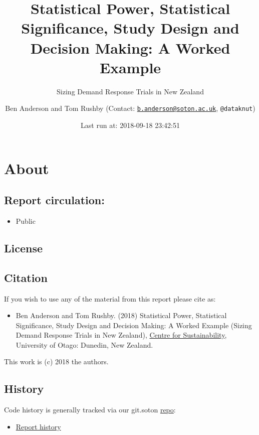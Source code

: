 \documentclass[]{article}
\title{Statistical Power, Statistical Significance, Study Design and Decision
Making: A Worked Example}
\subtitle{Sizing Demand Response Trials in New Zealand}
\author{Ben Anderson and Tom Rushby (Contact:
\href{mailto:b.anderson@soton.ac.uk}{\nolinkurl{b.anderson@soton.ac.uk}},
\texttt{@dataknut})}
\date{Last run at: 2018-09-18 23:42:51}
\providecommand{\tightlist}{%
  \setlength{\itemsep}{0pt}\setlength{\parskip}{0pt}}
\theoremstyle{definition}
\theoremstyle{definition}
\theoremstyle{definition}
\theoremstyle{remark}
\begin{document}
\maketitle

{
\setcounter{tocdepth}{2}
\tableofcontents
}
\newpage

\section{About}\label{about}

\subsection{Report circulation:}\label{report-circulation}

\begin{itemize}
\tightlist
\item
  Public
\end{itemize}

\subsection{License}\label{license}

\subsection{Citation}\label{citation}

If you wish to use any of the material from this report please cite as:

\begin{itemize}
\tightlist
\item
  Ben Anderson and Tom Rushby. (2018) Statistical Power, Statistical
  Significance, Study Design and Decision Making: A Worked Example
  (Sizing Demand Response Trials in New Zealand),
  \href{http://www.otago.ac.nz/centre-sustainability/}{Centre for
  Sustainability}, University of Otago: Dunedin, New Zealand.
\end{itemize}

This work is (c) 2018 the authors.

\subsection{History}\label{history}

Code history is generally tracked via our git.soton
\href{https://github.com/CfSOtago/GREENGrid}{repo}:

\begin{itemize}
\tightlist
\item
  \href{https://github.com/CfSOtago/GREENGrid/commits/master/analysis/powerAnalysis}{Report
  history}
\end{itemize}
\end{document}
